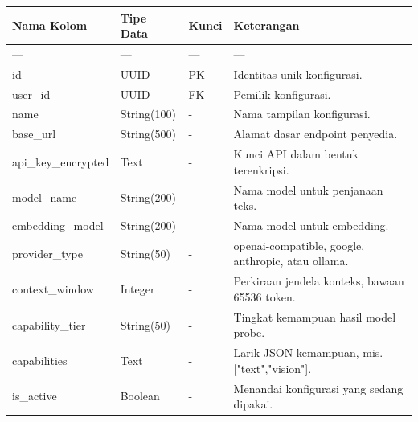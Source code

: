 \documentclass[12pt,a4paper]{article}
\begin{document}
\begin{table}[h]

\centering

\begin{tabular}{llll}

\toprule

Nama Kolom & Tipe Data & Kunci & Keterangan \\

\midrule

--- & --- & --- & --- \\

id & UUID & PK & Identitas unik konfigurasi. \\

user\_id & UUID & FK & Pemilik konfigurasi. \\

name & String(100) & - & Nama tampilan konfigurasi. \\

base\_url & String(500) & - & Alamat dasar endpoint penyedia. \\

api\_key\_encrypted & Text & - & Kunci API dalam bentuk terenkripsi. \\

model\_name & String(200) & - & Nama model untuk penjanaan teks. \\

embedding\_model & String(200) & - & Nama model untuk embedding. \\

provider\_type & String(50) & - & openai-compatible, google, anthropic, atau ollama. \\

context\_window & Integer & - & Perkiraan jendela konteks, bawaan 65536 token. \\

capability\_tier & String(50) & - & Tingkat kemampuan hasil model probe. \\

capabilities & Text & - & Larik JSON kemampuan, mis. {[}"text","vision"{]}. \\

is\_active & Boolean & - & Menandai konfigurasi yang sedang dipakai. \\

\bottomrule

\end{tabular}

\end{table}
\end{document}

